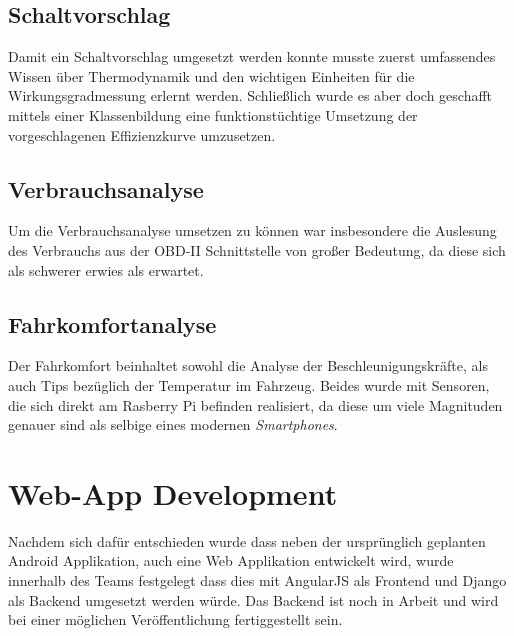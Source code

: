 \subsection{Schaltvorschlag}
Damit ein Schaltvorschlag umgesetzt werden konnte musste zuerst umfassendes Wissen über Thermodynamik und den wichtigen Einheiten für die Wirkungsgradmessung erlernt werden. Schließlich wurde es aber doch geschafft mittels einer Klassenbildung eine funktionstüchtige Umsetzung der vorgeschlagenen Effizienzkurve umzusetzen.
\subsection{Verbrauchsanalyse}
Um die Verbrauchsanalyse umsetzen zu können war insbesondere die Auslesung des Verbrauchs aus der OBD-II Schnittstelle von großer Bedeutung, da diese sich als schwerer erwies als erwartet.
\subsection{Fahrkomfortanalyse}
Der Fahrkomfort beinhaltet sowohl die Analyse der Beschleunigungskräfte, als auch Tips bezüglich der Temperatur im Fahrzeug. Beides wurde mit Sensoren, die sich direkt am Rasberry Pi befinden realisiert, da diese um viele Magnituden genauer sind als selbige eines modernen \textit{Smartphones}.
\section{Web-App Development}
Nachdem sich dafür entschieden wurde dass neben der ursprünglich geplanten Android Applikation, auch eine Web Applikation entwickelt wird, wurde innerhalb des Teams festgelegt dass dies mit AngularJS  als Frontend  und Django als Backend umgesetzt werden würde. Das Backend ist noch in Arbeit und wird bei einer möglichen Veröffentlichung fertiggestellt sein.